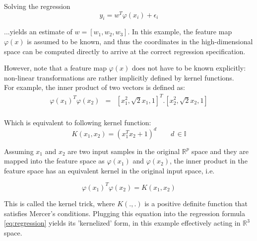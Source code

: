 \documentclass[10pt,]{beamer}
\begin{document}
\begin{frame}
Solving the regression
\begin{equation}
y_{i}=w^{T}\varphi(x_{i})+\epsilon_{i}
\end{equation}

...yields an estimate of $w=[w_1,w_2,w_3]$. In this example, the feature
map $\varphi(x)$ is assumed to be known, and thus the coordinates
in the high-dimensional space can be computed directly to arrive at
the correct regression specification. 
\end{frame}

\begin{frame}
However, note that a feature map $\varphi(x)$ does not have to be known explicitly: non-linear
transformations are rather implicitly defined by kernel functions.  \\
\vspace{0.5cm}
For example, the inner product of two vectors is defined as:
\begin{eqnarray}
\varphi(x_{1})^{T}\varphi(x_{2}) & = & [x_{1}^{2},\sqrt{2}x_{1},1]^{T}.[x_{2}^{2},\sqrt{2}x_{2},1]\\
\end{eqnarray}

Which is equivalent to following kernel function:
\begin{equation}
K(x_{1},x_{2})=(x_{1}^{T}x_{2}+1)^{d}\qquad d\,\in\mathbb{I}
\label{eq:polykernel}
\end{equation}
\end{frame}


\begin{frame}
Assuming $x_1$ and $x_2$ are two input samples in the original $\mathbb{R}^p$ space and they are
mapped into the feature space as $\varphi(x_1)$ and $\varphi(x_2)$, the inner product in the feature space has an equivalent kernel in the original input space, i.e. 

\begin{equation}
	\varphi(x_1)^T \varphi(x_2)=K(x_1,x_2)
\end{equation}

This is called the kernel trick, where $K(.,.)$ is a
positive definite function that satisfies Mercer's conditions. Plugging this equation into the regression formula \ref{eq:regression} yields its 'kernelized' form, in  this example effectively acting in $\mathbb{R}^3$ space. 
\end{frame}
\end{document}
